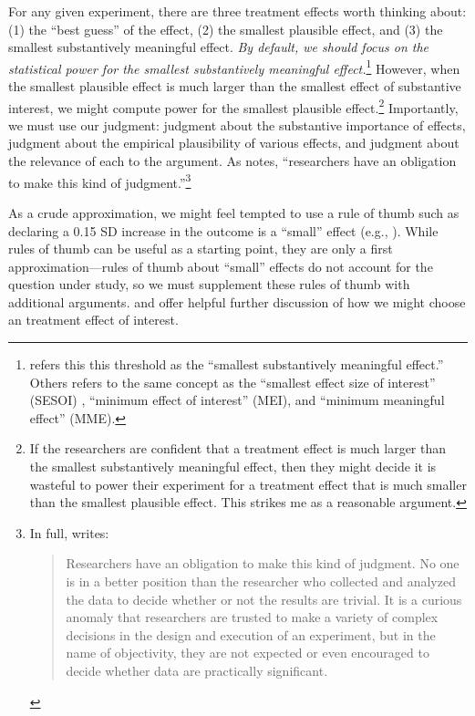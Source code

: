 \documentclass[12pt]{article}
\begin{document}
For any given experiment, there are three treatment effects worth thinking about: (1) the ``best guess'' of the effect, (2) the smallest plausible effect, and (3) the smallest substantively meaningful effect. 
\emph{By default, we should focus on the statistical power for the smallest substantively meaningful effect.}\footnote{
  \cite{Rainey2014} refers this this threshold as the ``smallest substantively meaningful effect.''
  Others refers to the same concept as the ``smallest effect size of interest'' (SESOI) \citep{Lakens2018}, ``minimum effect of interest'' (MEI), and ``minimum meaningful effect'' (MME).
  }
However, when the smallest plausible effect is much larger than the smallest effect of substantive interest, we might compute power for the smallest plausible effect.\footnote{
  If the researchers are confident that a treatment effect is much larger than the smallest substantively meaningful effect, then they might decide it is wasteful to power their experiment for a treatment effect that is much smaller than the smallest plausible effect. 
  This strikes me as a reasonable argument.
  } 
Importantly, we must use our judgment: judgment about the substantive importance of effects, judgment about the empirical plausibility of various effects, and judgment about the relevance of each to the argument. 
As \citet[755]{Kirk1996} notes, ``researchers have an obligation to make this kind of judgment.''\footnote{
In full, \citet[755]{Kirk1996} writes:
\begin{quote}
  Researchers have an obligation to make this kind of judgment. 
  No one is in a better position than the researcher who collected and analyzed the data to decide whether or not the results are trivial. 
  It is a curious anomaly that researchers are trusted to make a variety of complex decisions in the design and execution of an experiment, but in the name of objectivity, they are not expected or even encouraged to decide whether data are practically significant.  
\end{quote}
} 

As a crude approximation, we might feel tempted to use a rule of thumb such as declaring a 0.15 SD increase in the outcome is a ``small'' effect (e.g., \citealt{Lovakov2021}). 
While rules of thumb can be useful as a starting point, they are only a first approximation---rules of thumb about ``small'' effects do not account for the question under study, so we must supplement these rules of thumb with additional arguments. 
\citet[see esp. pp. 261-263]{Lakens2018} and \citet[see esp. pp. 10-13]{Lakens2022} offer helpful further discussion of how we might choose an treatment effect of interest.
\end{document}
